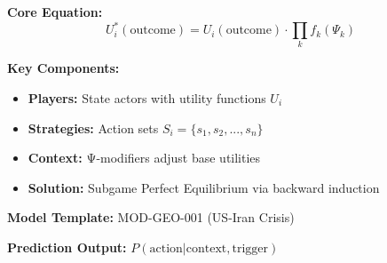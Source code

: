 
\begin{tcolorbox}[colback=blue!5!white, colframe=blue!75!black,
    title=Quick Reference: Crisis Escalation Framework]

\textbf{Core Equation:}
\begin{equation}
U^*_i(\text{outcome}) = U_i(\text{outcome}) \cdot \prod_k f_k(\Psi_k)
\end{equation}

\textbf{Key Components:}
\begin{itemize}[nosep]
\item \textbf{Players:} State actors with utility functions $U_i$
\item \textbf{Strategies:} Action sets $S_i = \{s_1, s_2, ..., s_n\}$
\item \textbf{Context:} Ψ-modifiers adjust base utilities
\item \textbf{Solution:} Subgame Perfect Equilibrium via backward induction
\end{itemize}

\textbf{Model Template:} MOD-GEO-001 (US-Iran Crisis)

\textbf{Prediction Output:} $P(\text{action} | \text{context}, \text{trigger})$

\end{tcolorbox}


